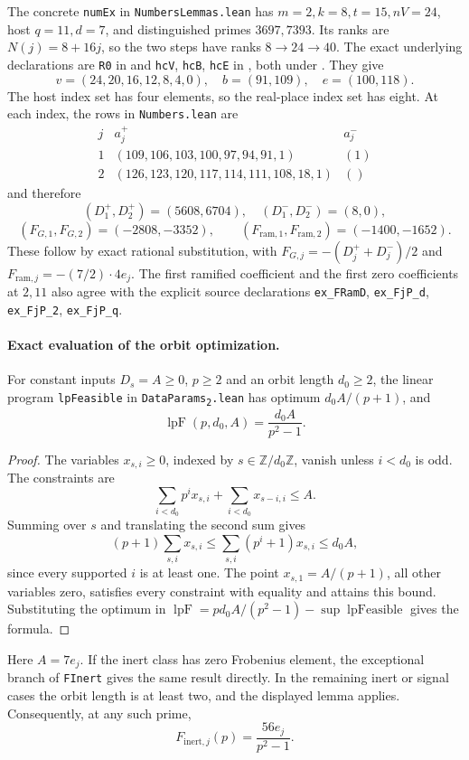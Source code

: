 The concrete \texttt{numEx} in \texttt{NumbersLemmas.lean} has
$m=2,k=8,t=15,nV=24$, host $q=11,d=7$, and distinguished primes
$3697,7393$.  Its ranks are $N(j)=8+16j$, so the two steps have ranks
$8\to24\to40$.  The exact underlying declarations are
\texttt{R0} in 
and \texttt{hcV}, \texttt{hcB}, \texttt{hcE} in
, both under
.  They give
\[
 v=(24,20,16,12,8,4,0),\quad b=(91,109),\quad e=(100,118).
\]
The host index set has four elements, so the real-place index set has
eight.  At each index, the rows in \texttt{Numbers.lean} are
\[
\begin{array}{c|l|l}
j&a^+_j&a^-_j\\ \hline
1&(109,106,103,100,97,94,91,1)&(1)\\
2&(126,123,120,117,114,111,108,18,1)&()
\end{array}
\]
and therefore
\[
 (D^+_1,D^+_2)=(5608,6704),\quad
 (D^-_1,D^-_2)=(8,0),
\]
\[
 (F_{G,1},F_{G,2})=(-2808,-3352),\qquad
 (F_{\mathrm{ram},1},F_{\mathrm{ram},2})=(-1400,-1652).
\]
These follow by exact rational substitution, with
$F_{G,j}=-(D^+_j+D^-_j)/2$ and
$F_{\mathrm{ram},j}=-(7/2)\cdot4e_j$.
The first ramified coefficient and the first zero coefficients at $2,11$
also agree with the explicit source declarations
\texttt{ex\_FRamD}, \texttt{ex\_FjP\_d},
\texttt{ex\_FjP\_2}, \texttt{ex\_FjP\_q}.

\paragraph{Exact evaluation of the orbit optimization.}
For constant inputs $D_s=A\ge0$, $p\ge2$ and an orbit length
$d_0\ge2$, the linear program \texttt{lpFeasible} in
\texttt{DataParams\textsubscript{2}.lean} has optimum
$d_0A/(p+1)$, and
\[
 \operatorname{lpF}(p,d_0,A)=\frac{d_0A}{p^2-1}.
\]
\begin{proof}
The variables $x_{s,i}\ge0$, indexed by $s\in\mathbb Z/d_0\mathbb Z$,
vanish unless $i<d_0$ is odd.  The constraints are
\[
 \sum_{i<d_0}p^i x_{s,i}+\sum_{i<d_0}x_{s-i,i}\le A.
\]
Summing over $s$ and translating the second sum gives
\[
 (p+1)\sum_{s,i}x_{s,i}
 \le\sum_{s,i}(p^i+1)x_{s,i}\le d_0A,
\]
since every supported $i$ is at least one.  The point
$x_{s,1}=A/(p+1)$, all other variables zero, satisfies every constraint
with equality and attains this bound.  Substituting the optimum in
$\operatorname{lpF}=p d_0A/(p^2-1)-\sup\operatorname{lpFeasible}$
gives the formula.
\end{proof}
Here $A=7e_j$.  If the inert class has zero Frobenius element, the
exceptional branch of \texttt{FInert} gives the same result directly.
In the remaining inert or signal cases the orbit length is at least two,
and the displayed lemma applies.  Consequently, at any such prime,
\[
 F_{\mathrm{inert},j}(p)=\frac{56e_j}{p^2-1}.
\]

